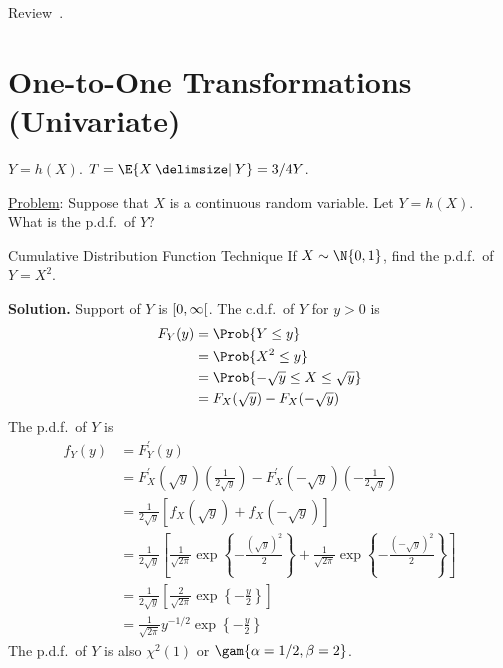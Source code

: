 \begin{Exercise}{}{}
    Review~.
\end{Exercise}
\section{One-to-One Transformations (Univariate)}
$ Y=h(X) $. $ T=\E{X\given Y}=3/4Y $.

\underline{Problem}: Suppose that $ X $ is a continuous
random variable. Let $ Y=h(X) $. What is the p.d.f.\ of $ Y $?
\begin{Example}{Cumulative Distribution Function Technique}{}
    If $ X \sim \N{0,1} $, find the p.d.f.\ of $ Y=X^2 $.

    \textbf{Solution.} Support of $ Y $ is $ \interval[open right]{0}{\infty} $.
    The c.d.f.\ of $ Y $ for $ y>0 $ is
    \begin{align*}
        F_Y(y)
         & =\Prob{Y\le y}                     \\
         & =\Prob{X^2\le y}                   \\
         & =\Prob{-\sqrt{y}\le X\le \sqrt{y}} \\
         & =F_X(\sqrt{y})-F_X(-\sqrt{y})
    \end{align*}
    The p.d.f.\ of $ Y $ is
    \begin{align*}
        f_Y(y)
         & =F_Y^\prime(y)                                                   \\
         & =F_X^\prime(\sqrt{y})\left( \frac{1}{2\sqrt{y}} \right)-
        F_X^\prime(-\sqrt{y})\left(-\frac{1}{2\sqrt{y}}\right)              \\
         & =\frac{1}{2\sqrt{y}}
        \left[ f_X(\sqrt{y})+f_X(-\sqrt{y})  \right]                        \\
         & =\frac{1}{2\sqrt{y}}
        \left[
            \frac{1}{\sqrt{2\pi}}\exp\left\{ -\frac{(\sqrt{y})^2}{2}\right\}
            +
            \frac{1}{\sqrt{2\pi}}\exp\left\{ -\frac{(-\sqrt{y})^2}{2}\right\}
        \right]                                                             \\
         & =\frac{1}{2\sqrt{y}}
        \left[ \frac{2}{\sqrt{2\pi}}\exp\left\{-\frac{y}{2}\right\} \right] \\
         & =\frac{1}{\sqrt{2\pi}}y^{-1/2}\exp\left\{ -\frac{y}{2} \right\}
    \end{align*}
    The p.d.f.\ of $ Y $ is also $ \chi^2(1) $ or
    $ \gam{\alpha=1/2,\beta=2} $.
\end{Example}
